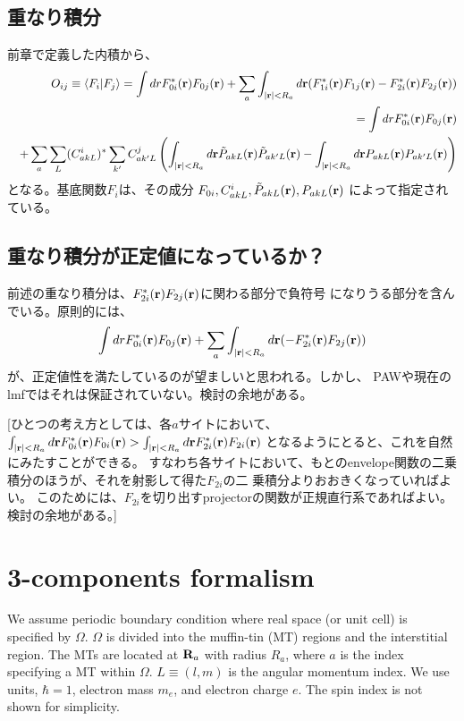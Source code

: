 \documentclass[a4paper,10pt,aip,onecolumn,amsmath,amssymb,floatfix,rmp]{revtex4-1}
\newcommand{\bfr}{{\bf r}}
\newcommand{\bfR}{{\bf R}}
\begin{document}
\subsection{重なり積分}
前章で定義した内積から、
\begin{eqnarray}
&&O_{ij} \equiv \langle F_i| F_j \rangle 
= \int dr F^*_{0i}(\bfr) F_{0j}(\bfr)  
+ \sum_a \int_{|\bfr| <R_a} d\bfr (F^{*}_{1i}(\bfr) F_{1j}(\bfr) - F^{*}_{2i}(\bfr) F_{2j}(\bfr)) \nonumber \\
&&= \int dr F^*_{0i}(\bfr) F_{0j}(\bfr)  \nonumber \\
&&+ \sum_a \sum_{L} (C^{i}_{akL})^* \sum_{k'} C^{j}_{ak'L}
\left(\int_{|\bfr| <R_a} d\bfr \tilde{P}_{akL}(\bfr) \tilde{P}_{ak'L}(\bfr)
-\int_{|\bfr| <R_a} d\bfr {P}_{akL}(\bfr) {P}_{ak'L}(\bfr) \right)
\label{eq:over}
\end{eqnarray}
となる。基底関数$F_{i}$は、その成分
$F_{0i},C^i_{akL},\tilde{P}_{akL}(\bfr),{P}_{akL}(\bfr)$
によって指定されている。


\subsection{重なり積分が正定値になっているか？}
前述の重なり積分は、$F^{*}_{2i}(\bfr) F_{2j}(\bfr)$に関わる部分で負符号
になりうる部分を含んでいる。原則的には、
\begin{eqnarray}
\int dr F^*_{0i}(\bfr) F_{0j}(\bfr)  
+ \sum_a \int_{|\bfr| <R_a} d\bfr ( - F^{*}_{2i}(\bfr) F_{2j}(\bfr)) \nonumber 
\label{eq:over2}
\end{eqnarray}
が、正定値性を満たしているのが望ましいと思われる。しかし、
PAWや現在のlmfではそれは保証されていない。検討の余地がある。

{\small [ひとつの考え方としては、各$a$サイトにおいて、
$\int_{|\bfr| <R_a} d\bfr F^*_{0i}(\bfr) F_{0i}(\bfr)  
>\int_{|\bfr| <R_a} d\bfr F^{*}_{2i}(\bfr) F_{2i}(\bfr)$ 
となるようにとると、これを自然にみたすことができる。
すなわち各サイトにおいて、もとのenvelope関数の二乗積分のほうが、それを射影して得た$F_{2i}$の二
乗積分よりおおきくなっていればよい。
このためには、$F_{2i}$を切り出すprojectorの関数が正規直行系であればよい。
検討の余地がある。]}


\section{3-components formalism}
\label{sec:formalism}
We assume periodic boundary condition where
real space (or unit cell) is specified by $\Omega$.
$\Omega$ is divided into the muffin-tin (MT) regions and the interstitial region.
The MTs are located at $\bfR_a$ with radius $R_a$, where 
$a$ is the index specifying a MT within $\Omega$.
$L\equiv(l,m)$ is the angular momentum index.
We use units, $\hbar=1$, electron mass $m_e$, and electron charge $e$. 
The spin index is not shown for simplicity.
\end{document}
